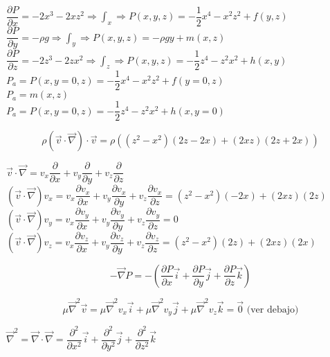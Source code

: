 \begin{enumerate}
\begin{enumerate}
		$\dfrac{\partial P}{\partial x} = -2x^3 -2xz^2 \Rightarrow \int_x \Rightarrow P(x,y,z) = -\dfrac{1}{2} x^4 - x^2z^2 + f(y,z)$\\
		$\dfrac{\partial P}{\partial y} = -\rho g \Rightarrow \int_y \Rightarrow P(x,y,z) = -\rho g y + m(x,z)$\\
		$\dfrac{\partial P}{\partial z} = -2z^3 -2zx^2 \Rightarrow \int_z \Rightarrow P(x,y,z) = -\dfrac{1}{2} z^4 - z^2x^2 + h(x,y)$\\
		
		$P_a = P(x, y=0, z) = -\dfrac{1}{2} x^4 - x^2z^2 + f(y = 0,z)$\\
		$P_a = m(x,z)$\\
		$P_a = P(x, y=0, z) = -\dfrac{1}{2} z^4 - z^2x^2 + h(x,y=0)$
		
		\[\rho (\vec{v} \cdot \vec{\nabla}) \cdot \vec{v} = \rho ((z^2 - x^2)(2z-2x) + (2xz)(2z + 2x))\]
		
		$\vec{v} \cdot \vec{\nabla} = 
			v_x \dfrac{\partial}{\partial x} + 
			v_y \dfrac{\partial}{\partial y} + 
			v_z \dfrac{\partial}{\partial z}
		$\\
		
		$(\vec{v} \cdot \vec{\nabla})v_x = 
			v_x \dfrac{\partial v_x}{\partial x} + 
			v_y \dfrac{\partial v_x}{\partial y} + 
			v_z \dfrac{\partial v_x}{\partial z} =
			(z^2 - x^2)(-2x) + (2xz)(2z)
		$\\
		
		$(\vec{v} \cdot \vec{\nabla})v_y = 
			v_x \dfrac{\partial v_y}{\partial x} + 
			v_y \dfrac{\partial v_y}{\partial y} + 
			v_z \dfrac{\partial v_y}{\partial z} =
			0
		$\\
		
		$(\vec{v} \cdot \vec{\nabla})v_z = 
			v_x \dfrac{\partial v_z}{\partial x} + 
			v_y \dfrac{\partial v_z}{\partial y} + 
			v_z \dfrac{\partial v_z}{\partial z} =
			(z^2 - x^2)(2z) + (2xz)(2x)
		$
		
		\[-\vec{\nabla} P = -\left(
			\dfrac{\partial P}{\partial x} \vec{i} +
			\dfrac{\partial P}{\partial y} \vec{j} +
			\dfrac{\partial P}{\partial z} \vec{k}
			\right)
		\]	
		
		\[
			\mu \vec{\nabla}^2 \vec{v} =
				\mu \vec{\nabla}^2 v_x \vec{i} + 
				\mu \vec{\nabla}^2 v_y \vec{j} + 
				\mu \vec{\nabla}^2 v_z \vec{k} =
				\vec{0} \text{ (ver debajo)}
		\]
		
		$\vec{\nabla}^2 = \vec{\nabla} \cdot \vec{\nabla} = 
			\dfrac{\partial^2}{\partial x^2} \vec{i} +
			\dfrac{\partial^2}{\partial y^2} \vec{j} +
			\dfrac{\partial^2}{\partial z^2} \vec{k}
		$\\
		

\end{enumerate}
\end{enumerate}
